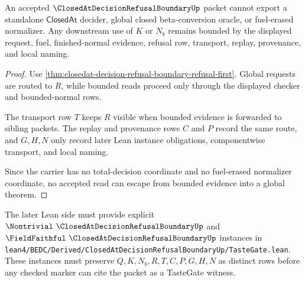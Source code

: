\begin{theorem}
\label{thm:closedat-decision-refusal-boundary-nonescape}
An accepted $\ClosedAtDecisionRefusalBoundaryUp$ packet cannot export a standalone $\mathsf{ClosedAt}$ decider, global closed beta-conversion oracle, or fuel-erased normalizer. Any downstream use of $K$ or $N_b$ remains bounded by the displayed request, fuel, finished-normal evidence, refusal row, transport, replay, provenance, and local naming.
\end{theorem}
\begin{proof}
Use \autoref{thm:closedat-decision-refusal-boundary-refusal-first}. Global requests are routed to $R$, while bounded reads proceed only through the displayed checker and bounded-normal rows.

The transport row $T$ keeps $R$ visible when bounded evidence is forwarded to sibling packets. The replay and provenance rows $C$ and $P$ record the same route, and $G,H,N$ only record later Lean instance obligations, componentwise transport, and local naming.

Since the carrier has no total-decision coordinate and no fuel-erased normalizer coordinate, no accepted read can escape from bounded evidence into a global theorem.
\end{proof}

The later Lean side must provide explicit $\Nontrivial\ \ClosedAtDecisionRefusalBoundaryUp$ and $\FieldFaithful\ \ClosedAtDecisionRefusalBoundaryUp$ instances in \texttt{lean4/BEDC/Derived/ClosedAtDecisionRefusalBoundaryUp/TasteGate.lean}. These instances must preserve $Q,K,N_b,R,T,C,P,G,H,N$ as distinct rows before any checked marker can cite the packet as a TasteGate witness.




